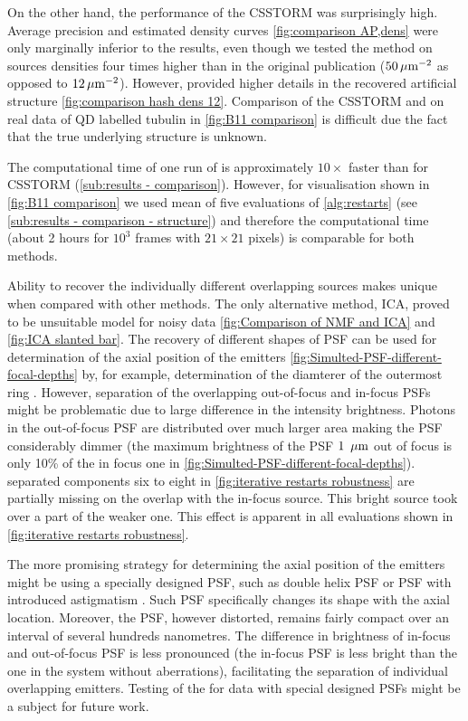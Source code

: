 On the other hand, the performance of the CSSTORM was surprisingly high. Average precision and estimated density curves \autoref{fig:comparison AP,dens} were only marginally inferior to the \inmf{} results, even though we tested the method on sources densities four times higher than in the original publication \cite{Zhu2012} ($50 \, \mathrm{\mu m}^{-2}$ as opposed to $12 \, \mathrm{\mu m}^{-2}$). However, \inmf{} provided higher details in the recovered artificial structure \autoref{fig:comparison hash dens 12}. Comparison of the CSSTORM and \inmf{} on real data of QD labelled tubulin in \autoref{fig:B11 comparison} is difficult due the fact that the true underlying structure is unknown. 

The computational time of one run of \inmf{} is approximately $10\times$ faster than for CSSTORM (\autoref{sub:results - comparison}). However, for visualisation shown in \autoref{fig:B11 comparison} we used mean of five evaluations of \autoref{alg:restarts} (see \autoref{sub:results - comparison - structure}) and therefore the computational time (about 2 hours for  $10^{3}$ frames with $21 \times 21$ pixels) is comparable for both methods. 

Ability to recover the individually different overlapping sources makes \inmf{} unique when compared with other methods. The only alternative method, ICA, proved to be unsuitable model for noisy data \autoref{fig:Comparison of NMF and ICA} and \ref{fig:ICA slanted bar}. The recovery of different shapes of PSF can be used for determination of the axial position of the emitters \autoref{fig:Simulted-PSF-different-focal-depths} by, for example, determination of the diamterer of the outermost ring \cite{Speidel2003}. However, separation of the overlapping out-of-focus and in-focus PSFs might be problematic due to large difference in the intensity brightness. Photons in the out-of-focus PSF are distributed over much larger area making the PSF considerably dimmer (the maximum brightness of the PSF $1\ \, \mathrm{\mu m}$ out of focus is only 10\% of the in focus one in \autoref{fig:Simulted-PSF-different-focal-depths}). \inmf{} separated components six to eight in \autoref{fig:iterative restarts robustness} are partially missing on the overlap with the in-focus source. This bright source took over a part of the weaker one. This effect is apparent in all evaluations shown in \autoref{fig:iterative restarts robustness}.

The more promising strategy for determining the axial position of the emitters might be using a specially designed PSF, such as double helix PSF \cite{Quirin2011} or PSF with introduced astigmatism \cite{Huang2008}. Such PSF specifically changes its shape with the axial location. Moreover, the PSF, however distorted, remains fairly compact over an interval of several hundreds nanometres. The difference in brightness of in-focus and out-of-focus PSF is less pronounced (the in-focus PSF is less bright than the one in the system without aberrations), facilitating the separation of individual overlapping emitters. Testing of the \inmf{} for data with special designed PSFs \cite{Huang2008,Quirin2011} might be a subject for future work. 

